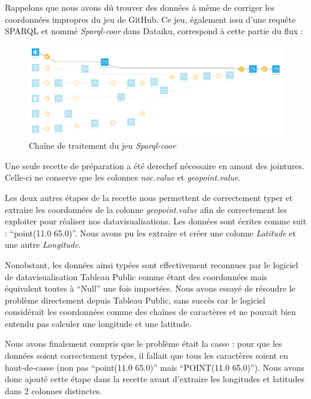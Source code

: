 \documentclass[hidelinks, 12pt]{report}
\begin{document}
Rappelons que nous avons dû trouver des données à même de corriger les coordonnées impropres du jeu de GitHub. Ce jeu, également issu d'une requête SPARQL et nommé \textit{Sparql-coor} dans Dataiku, correspond à cette partie du flux :

\begin{center}
	\begin{figure}[H]
		\setlength{\belowcaptionskip}{-35pt}
		\includegraphics[scale=0.35]{images/flow-medals-sparql-coor.png}
		\caption{Chaîne de traitement du jeu \textit{Sparql-coor}}
	\end{figure}
\end{center}

Une seule recette de préparation a été derechef nécessaire en amont des jointures. Celle-ci ne conserve que les colonnes \textit{noc.value} et \textit{geopoint.value}.

Les deux autres étapes de la recette nous permettent de correctement typer et extraire les coordonnées de la colonne \textit{geopoint.value} afin de correctement les exploiter pour réaliser nos datavisualisations. \label{casse}Les données sont écrites comme suit : \enquote{point(11.0 65.0)}. Nous avons pu les extraire et créer une colonne \textit{Latitude} et une autre \textit{Longitude}.

Nonobstant, les données ainsi typées sont effectivement reconnues par le logiciel de datavisualisation Tableau Public comme étant des coordonnées mais équivalent toutes à \enquote{Null} une fois importées. Nous avons essayé de résoudre le problème directement depuis Tableau Public, sans succès car le logiciel considérait les coordonnées comme des chaînes de caractères et ne pouvait bien entendu pas calculer une longitude et une latitude.

Nous avons finalement compris que le problème était la casse : pour que les données soient correctement typées, il fallait que tous les caractères soient en haut-de-casse (non pas \enquote{point(11.0 65.0)} mais \enquote{POINT(11.0 65.0)}). Nous avons donc ajouté cette étape dans la recette avant d'extraire les longitudes et latitudes dans 2 colonnes distinctes.
\end{document}
